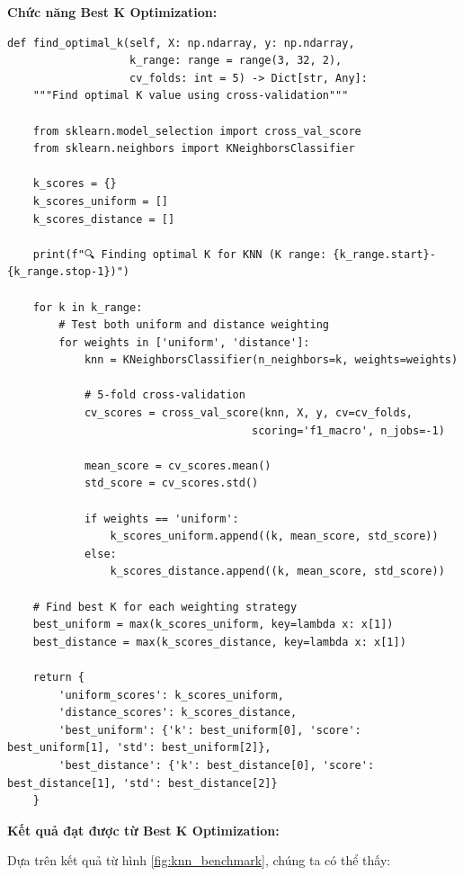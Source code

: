 \textbf{Chức năng Best K Optimization:}

\begin{verbatim}
def find_optimal_k(self, X: np.ndarray, y: np.ndarray, 
                   k_range: range = range(3, 32, 2),
                   cv_folds: int = 5) -> Dict[str, Any]:
    """Find optimal K value using cross-validation"""
    
    from sklearn.model_selection import cross_val_score
    from sklearn.neighbors import KNeighborsClassifier
    
    k_scores = {}
    k_scores_uniform = []
    k_scores_distance = []
    
    print(f"🔍 Finding optimal K for KNN (K range: {k_range.start}-{k_range.stop-1})")
    
    for k in k_range:
        # Test both uniform and distance weighting
        for weights in ['uniform', 'distance']:
            knn = KNeighborsClassifier(n_neighbors=k, weights=weights)
            
            # 5-fold cross-validation
            cv_scores = cross_val_score(knn, X, y, cv=cv_folds, 
                                      scoring='f1_macro', n_jobs=-1)
            
            mean_score = cv_scores.mean()
            std_score = cv_scores.std()
            
            if weights == 'uniform':
                k_scores_uniform.append((k, mean_score, std_score))
            else:
                k_scores_distance.append((k, mean_score, std_score))
    
    # Find best K for each weighting strategy
    best_uniform = max(k_scores_uniform, key=lambda x: x[1])
    best_distance = max(k_scores_distance, key=lambda x: x[1])
    
    return {
        'uniform_scores': k_scores_uniform,
        'distance_scores': k_scores_distance,
        'best_uniform': {'k': best_uniform[0], 'score': best_uniform[1], 'std': best_uniform[2]},
        'best_distance': {'k': best_distance[0], 'score': best_distance[1], 'std': best_distance[2]}
    }
\end{verbatim}

\textbf{Kết quả đạt được từ Best K Optimization:}

Dựa trên kết quả từ hình \ref{fig:knn_benchmark}, chúng ta có thể thấy:

